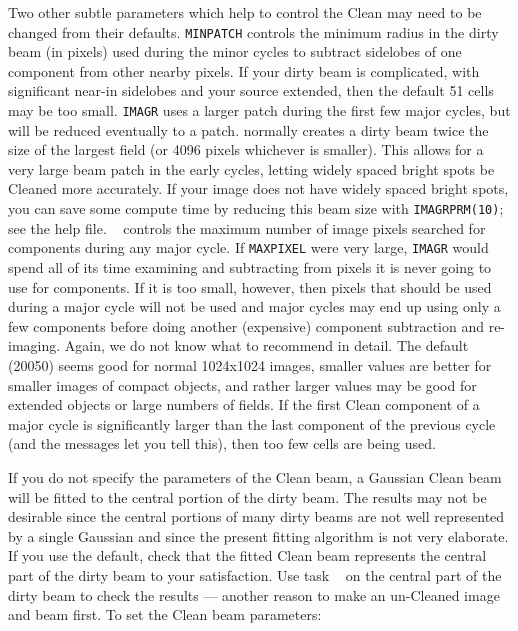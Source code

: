      Two other subtle parameters which help to control the Clean may
need to be changed from their defaults.  {\tt MINPATCH} controls the
minimum radius in the dirty beam (in pixels) used during the minor
cycles to subtract sidelobes of one component from other nearby
pixels.  If your dirty beam is complicated, with significant near-in
sidelobes and your source extended, then the default 51 cells may be
too small.  {\tt IMAGR} uses a larger patch during the first few major
cycles, but will be reduced eventually to a {\tt {}}
patch. {\tt {}} normally creates a dirty beam twice the size
of the largest field (or 4096 pixels whichever is smaller).  This
allows for a very large beam patch in the early cycles, letting widely
spaced bright spots be Cleaned more accurately.  If your image does
not have widely spaced bright spots, you can save some compute time by
reducing this beam size with {\tt IMAGRPRM(10)}; see the help file.  {\tt
{}} controls the maximum number of image pixels searched
for components during any major cycle.  If {\tt MAXPIXEL} were very
large, {\tt IMAGR} would spend all of its time examining and
subtracting from pixels it is never going to use for components.  If
it is too small, however, then pixels that should be used during a
major cycle will not be used and major cycles may end up using only a
few components before doing another (expensive) component subtraction
and re-imaging. Again, we do not know what to recommend in detail.
The default (20050) seems good for normal 1024x1024 images, smaller
values are better for smaller images of compact objects, and rather
larger values may be good for extended objects or large numbers of
fields.  If the first Clean component of a major cycle is
significantly larger than the last component of the previous cycle
(and the messages let you tell this), then too few cells are being
used.

     If you do not specify the parameters of the Clean beam, a
Gaussian Clean beam will be fitted to the central portion of the dirty
beam.  The results may not be desirable since the central portions of
many dirty beams are not well represented by a single Gaussian and
since the present fitting algorithm is not very elaborate.  If you use
the default, check that the fitted Clean beam represents the central
part of the dirty beam to your satisfaction.  Use task {\tt
{}} on the central part of the dirty beam to check the
results --- another reason to make an un-Cleaned image and beam first.
To set the Clean beam parameters:

